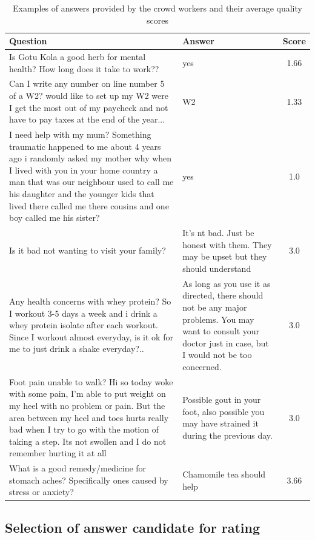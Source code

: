 \documentclass[letterpaper]{article}
\begin{document}
\begin{table}[ht]
\centering
\begin{tabular}{| p{10.2cm} | p{5cm} | c |}
\hline
Question & Answer & Score \\
\hline
 Is Gotu Kola a good herb for mental health? How long does it take to work?? & yes & 1.66\\
 \hline
Can I write any number on line number 5 of a W2?  would like to set up my W2 were I get the most out of my paycheck and not have to pay taxes at the end of the year... & W2 & 1.33\\
 \hline
I need help with my mum? Something traumatic happened to me about 4 years ago i randomly asked my mother why when I lived with you in your home country a man that was our neighbour used to call me his daughter and the younger kids that lived there called me there cousins and one boy called me his sister? & yes & 1.0\\
\hline
\hline
 Is it bad not wanting to visit your family? & It's nt bad. Just be honest with them. They may be upset but they should understand & 3.0 \\
 \hline
Any health concerns with whey protein? So I workout 3-5 days a week and i drink a whey protein isolate after each workout. Since I workout almost everyday, is it ok for me to just drink a shake everyday?.. & As long as you use it as directed, there should not be any major problems.  You may want to consult your doctor just in case, but I would not be too concerned. & 3.0\\
\hline
Foot pain unable to walk? Hi so today woke with some pain, I'm able to put weight on my heel with no problem or pain.  But  the area between my heel and toes hurts really bad when I try to go with the motion of taking a step. Its not swollen and I do not remember hurting it at all & Possible gout in your foot, also possible you may have strained it during the previous day. & 3.0\\
\hline
What is a good remedy/medicine for stomach aches? Specifically ones caused by stress or anxiety? & Chamomile tea should help & 3.66\\
\hline
\end{tabular}
\caption{Examples of answers provided by the crowd workers and their average quality scores}
\label{table:answer_examples}
\end{table}

\subsection{Selection of answer candidate for rating}
\label{sec:analysis:order}
\end{document}
